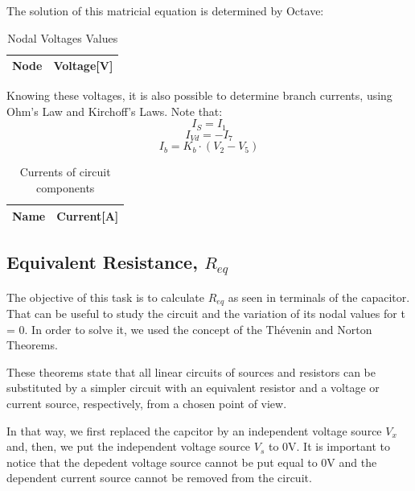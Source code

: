 The solution of this matricial equation is determined by Octave:
\begin{table}[H]
  \centering
  \begin{tabular}{|l|r|}
    \hline    
    {\bf Node} & {\bf Voltage[V]} \\ \hline
    
  \end{tabular}
  \caption{Nodal Voltages Values}
  \label{tab:nodal}
\end{table}

Knowing these voltages, it is also possible to determine branch currents, using Ohm’s Law and Kirchoff's Laws.
Note that:
\begin{equation}
  I_S=I_1
\end{equation}
\begin{equation}
  I_{Vd}=-I_7
 \end{equation}
 \begin{equation}
  I_b=K_b\cdot(V_2-V_5)
\end{equation}
 
 \begin{table}[H]
  \centering
  \begin{tabular}{|l|r|}
    \hline    
    {\bf Name} & {\bf Current[A]} \\ \hline
    
  \end{tabular}
  \caption{Currents of circuit components}
  \label{tab:valn}
\end{table}

\subsection{Equivalent Resistance, $R_{eq}$}
The objective of this task is to calculate $R_{eq}$ as seen in terminals of the capacitor. That can be useful to study the circuit and the variation of its nodal values for t = 0.
In order to solve it, we used the concept of the Thévenin and Norton Theorems.\par
These theorems state that all linear circuits of sources and resistors can be substituted by a simpler circuit with an equivalent resistor and a voltage or current source, respectively, from a chosen point of view.

In that way, we first replaced the capcitor by an independent voltage source $V_x$ and, then, we put the independent voltage source $V_s$ to 0V. It is important to notice that the depedent voltage source cannot be put equal to 0V and the dependent current source cannot be removed from the circuit.

